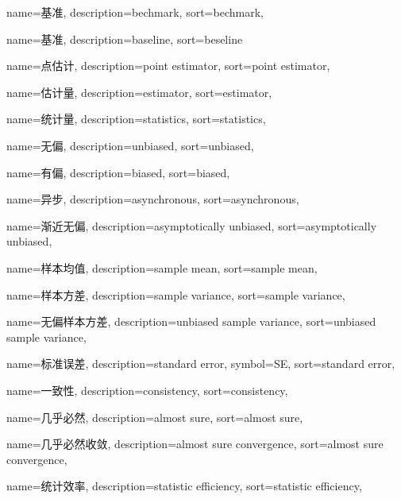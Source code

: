 {
  name=基准,
  description={bechmark},
  sort={bechmark},
}

{
  name=基准,
  description={baseline},
  sort={beseline}
}

{
  name=点估计,
  description={point estimator},
  sort={point estimator},
}

{
  name=估计量,
  description={estimator},
  sort={estimator},
}

{
  name=统计量,
  description={statistics},
  sort={statistics},
}

{
  name=无偏,
  description={unbiased},
  sort={unbiased},
}

{
	name=有偏,
	description={biased},
	sort={biased},
}

{
	name=异步,
	description={asynchronous},
	sort={asynchronous},
}


{
  name=渐近无偏,
  description={asymptotically unbiased},
  sort={asymptotically unbiased},
}

{
  name=样本均值, %
  description={sample mean},
  sort={sample mean},
}

{
  name=样本方差, %
  description={sample variance},
  sort={sample variance},
}

{
  name=无偏样本方差, %
  description={unbiased sample variance},
  sort={unbiased sample variance},
}

{
  name=标准误差,
  description={standard error},
  symbol={SE},
  sort={standard error},
}

{
  name=一致性,
  description={consistency},
  sort={consistency},
}

{
  name=几乎必然,
  description={almost sure},
  sort={almost sure},
}

{
  name=几乎必然收敛,
  description={almost sure convergence},
  sort={almost sure convergence},
}

{
  name=统计效率,
  description={statistic efficiency},
  sort={statistic efficiency},
}

